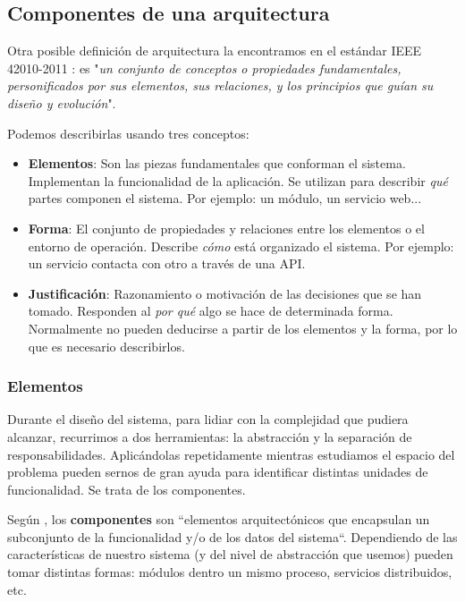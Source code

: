 \subsection{Componentes de una arquitectura}

Otra posible definición de arquitectura la encontramos en el estándar IEEE 42010-2011 \cite{ieeeStandard420102011Systems2011}: es "\emph{un conjunto de conceptos o propiedades fundamentales, personificados por sus elementos, sus relaciones, y los principios que guían su diseño y evolución}".

Podemos describirlas usando tres conceptos: \cite{perryFoundationsStudySoftware1992}

    \begin{itemize}
        \item \textbf{Elementos}: Son las piezas fundamentales que conforman el sistema. Implementan la funcionalidad de la aplicación. Se utilizan para describir \emph{qué} partes componen el sistema. Por ejemplo: un módulo, un servicio web...

        \item \textbf{Forma}: El conjunto de propiedades y relaciones entre los elementos o el entorno de operación. Describe \emph{cómo} está organizado el sistema. Por ejemplo: un servicio contacta con otro a través de una API.

        \item \textbf{Justificación}: Razonamiento o motivación de las decisiones que se han tomado. Responden al \emph{por qué} algo se hace de determinada forma. Normalmente no pueden deducirse a partir de los elementos y la forma, por lo que es necesario describirlos.

    \end{itemize}

\pagebreak

\subsubsection{Elementos}

Durante el diseño del sistema, para lidiar con la complejidad que pudiera alcanzar, recurrimos a dos herramientas: la abstracción y la separación de responsabilidades. \cite{martinCleanArchitectureCraftsman2018} Aplicándolas repetidamente mientras estudiamos el espacio del problema pueden sernos de gran ayuda para identificar distintas unidades de funcionalidad. Se trata de los componentes.

Según \cite{taylorSoftwareArchitectureFoundations2009}, los \textbf{componentes} son ``elementos arquitectónicos que encapsulan un subconjunto de la funcionalidad y/o de los datos del sistema``.
Dependiendo de las características de nuestro sistema (y del nivel de abstracción que usemos) pueden tomar distintas formas: módulos dentro un mismo proceso, servicios distribuidos, etc.

